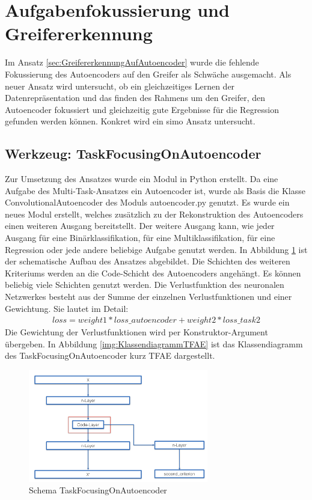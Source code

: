 	
	
	\section{Aufgabenfokussierung und Greifererkennung}
	\label{sec:MultiTaskGreifererkennung}
	Im Ansatz \ref{sec:GreifererkennungAufAutoencoder} wurde die fehlende Fokussierung des Autoencoders auf den Greifer als Schwäche ausgemacht. Als neuer Ansatz wird untersucht, ob ein gleichzeitiges Lernen der Datenrepräsentation und das finden des Rahmens um den Greifer, den Autoencoder fokussiert und gleichzeitig gute Ergebnisse für die Regression gefunden werden können. Konkret wird ein \ac{simo} Ansatz untersucht.  
	
	\subsection{Werkzeug: TaskFocusingOnAutoencoder}
	\label{subsec:SecondCriterionAutoenocder}
	Zur Umsetzung des Ansatzes wurde ein Modul in Python erstellt. Da eine Aufgabe des Multi-Task-Ansatzes ein Autoencoder ist, wurde als Basis die Klasse ConvolutionalAutoencoder des Moduls autoencoder.py genutzt. Es wurde ein neues Modul erstellt, welches zusätzlich zu der Rekonstruktion des Autoencoders einen weiteren Ausgang bereitstellt. Der weitere Ausgang kann, wie jeder Ausgang für eine Binärklassifikation, für eine Multiklassifikation, für eine Regression oder jede andere beliebige Aufgabe genutzt werden. In Abbildung \ref{img:SchemaTFAE} ist der schematische Aufbau des Ansatzes abgebildet. Die Schichten des weiteren Kriteriums werden an die Code-Schicht des Autoencoders angehängt. Es können beliebig viele Schichten genutzt werden. Die Verlustfunktion des neuronalen Netzwerkes besteht aus der Summe der einzelnen Verlustfunktionen und einer Gewichtung. Sie lautet im Detail: 
	\begin{align}
	loss = weight1 * loss\_autoencoder + weight2 * loss\_task2
	\end{align}
	Die Gewichtung der Verlustfunktionen wird per Konstruktor-Argument übergeben. In Abbildung \ref{img:KlassendiagrammTFAE} ist das Klassendiagramm des TaskFocusingOnAutoencoder kurz TFAE dargestellt.
	\begin{figure}[h]
		\centering
		\includegraphics[width=0.7\textwidth, center]{bilder/Schema_Autoencoders/Schema_SCAE.png}
		\caption[Schema TaskFocusingOnAutoencoder]{Schema TaskFocusingOnAutoencoder}
		\label{img:SchemaTFAE}
	\end{figure}  
